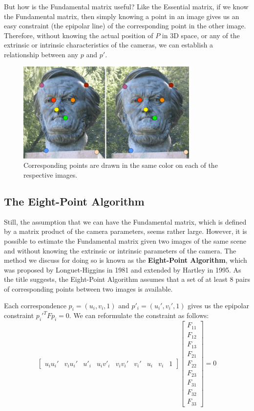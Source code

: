 \documentclass[a4paper, 12pt]{article}
\renewcommand\emph{\textbf}
\begin{document}
But how is the Fundamental matrix useful? Like the Essential matrix, if we know the Fundamental matrix, then simply knowing a point in an image gives us an easy constraint (the epipolar line) of the corresponding point in the other image. Therefore, without knowing the actual position of $P$ in 3D space, or any of the extrinsic or intrinsic characteristics of the cameras, we can establish a relationship between any $p$ and $p'$. 

\begin{figure}[h!]
\centering
\includegraphics[width=0.8\textwidth]{figures/correspondence.png}
\caption{Corresponding points are drawn in the same color on each of the respective images.}
\label{fig:correspondence}
\end{figure}

\subsection{The Eight-Point Algorithm}
Still, the assumption that we can have the Fundamental matrix, which is defined by a matrix product of the camera parameters, seems rather large. However, it is possible to estimate the Fundamental matrix given two images of the same scene and without knowing the extrinsic or intrinsic parameters of the camera. The method we discuss for doing so is known as the \emph{Eight-Point Algorithm}, which was proposed by Longuet-Higgins in 1981 and extended by Hartley in 1995. As the title suggests, the Eight-Point Algorithm assumes that a set of at least 8 pairs of corresponding points between two images is available.

Each correspondence $p_i = (u_i, v_i, 1)$ and $p'_i = (u_i', v_i', 1)$ gives us the epipolar constraint $p_i'^T F p_i = 0$. We can reformulate the constraint as follows:
\begin{equation}
    \begin{bmatrix}u_iu_i' & v_iu_i' & u'_i & u_iv'_i &  v_iv_i' & v_i' & u_i & v_i & 1\end{bmatrix}
    \begin{bmatrix}F_{11}\\F_{12}\\F_{13}\\F_{21}\\F_{22}\\F_{23}\\F_{31}\\F_{32}\\F_{33}\end{bmatrix} = 0
\end{equation}
\end{document}
